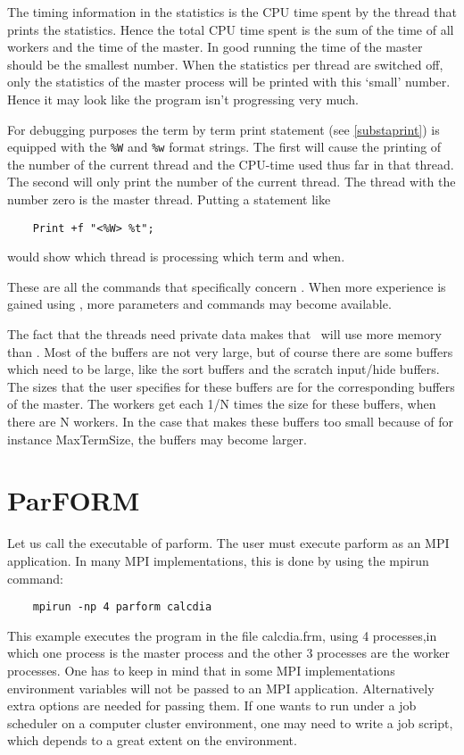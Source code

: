 The timing information in the statistics is the CPU time 
spent by the thread that prints the statistics. Hence the total CPU time 
spent is the sum of the time of all workers and the time of the master. In 
good running the time of the master should be the smallest number. When the 
statistics per thread are switched off, only the statistics of the master 
process will be printed with this `small' number. Hence it may look like 
the program isn't progressing very much.

For debugging purposes the term by term print statement (see 
\ref{substaprint}) is equipped with the \verb:%W: and \verb:%w: format 
strings. The first will cause the printing of the number of the current 
thread and the CPU-time used thus far in that thread. The second will only 
print the number of the current thread. The thread with the number zero is 
the master thread. Putting a statement like
\begin{verbatim}
    Print +f "<%W> %t";
\end{verbatim}
would show which thread is processing which term and when.

These are all the commands that specifically concern \TFORM. When more 
experience is gained using \TFORM, more parameters and commands may become 
available.

The fact that the threads need private data makes that \TFORM\ 
will use more memory than \FORM. Most of the buffers are not very large, but 
of course there are some buffers which need to be large, like the sort 
buffers and the scratch input\index{input}/hide\index{hide} buffers. The 
sizes that the user specifies for these buffers are for the corresponding 
buffers of the master. The workers get each 1/N times the size for these 
buffers, when there are N workers. In the case that makes these buffers too 
small because of for instance MaxTermSize, the buffers may become larger.


\section{ParFORM}
\label{parform}

Let us call the executable of \ParFORM{} parform.
The user must execute parform as an MPI application.
In many MPI implementations, this is done by using the mpirun
command:
\begin{verbatim}
    mpirun -np 4 parform calcdia
\end{verbatim}
This example executes the program in the file calcdia.frm, using 4 
processes,in which one process is the master process and the other 3 
processes are the worker processes.
One has to keep in mind that in some MPI implementations environment 
variables will not be passed to an MPI application. Alternatively extra 
options are needed for passing them.
If one wants to run \ParFORM{} under a job scheduler on a computer cluster
environment, one may need to write a job script, which depends to a great 
extent on the environment.

